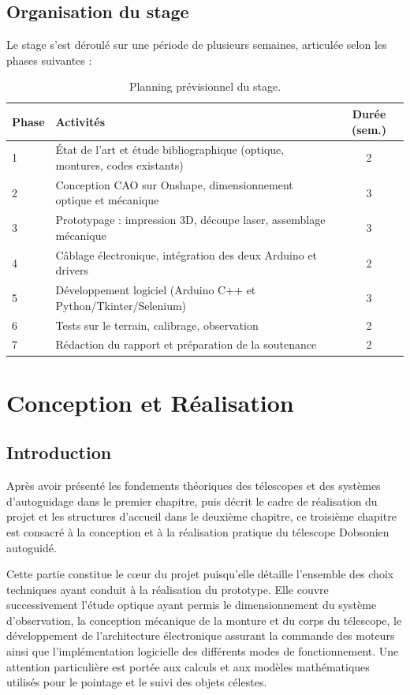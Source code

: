 \documentclass[12pt,a4paper]{report}
\begin{document}
\section{Organisation du stage}
Le stage s'est déroulé sur une période de plusieurs semaines, articulée selon les phases suivantes :
\begin{table}[H]
    \centering
    \caption{Planning prévisionnel du stage.}
    \begin{tabular}{|l|p{8cm}|c|}
        \hline
        \textbf{Phase} & \textbf{Activités} & \textbf{Durée (sem.)} \\
        \hline
        1 & État de l'art et étude bibliographique (optique, montures, codes existants) & 2 \\
        2 & Conception CAO sur Onshape, dimensionnement optique et mécanique & 3 \\
        3 & Prototypage : impression 3D, découpe laser, assemblage mécanique & 3 \\
        4 & Câblage électronique, intégration des deux Arduino et drivers & 2 \\
        5 & Développement logiciel (Arduino C++ et Python/Tkinter/Selenium) & 3 \\
        6 & Tests sur le terrain, calibrage, observation & 2 \\
        7 & Rédaction du rapport et préparation de la soutenance & 2 \\
        \hline
    \end{tabular}
\end{table}

\clearpage

\chapter{Conception et Réalisation}
\section{Introduction}

Après avoir présenté les fondements théoriques des télescopes et des systèmes d’autoguidage dans le premier chapitre, puis décrit le cadre de réalisation du projet et les structures d’accueil dans le deuxième chapitre, ce troisième chapitre est consacré à la conception et à la réalisation pratique du télescope Dobsonien autoguidé.

Cette partie constitue le cœur du projet puisqu’elle détaille l’ensemble des choix techniques ayant conduit à la réalisation du prototype. Elle couvre successivement l’étude optique ayant permis le dimensionnement du système d’observation, la conception mécanique de la monture et du corps du télescope, le développement de l’architecture électronique assurant la commande des moteurs ainsi que l’implémentation logicielle des différents modes de fonctionnement. Une attention particulière est portée aux calculs et aux modèles mathématiques utilisés pour le pointage et le suivi des objets célestes.
\end{document}
